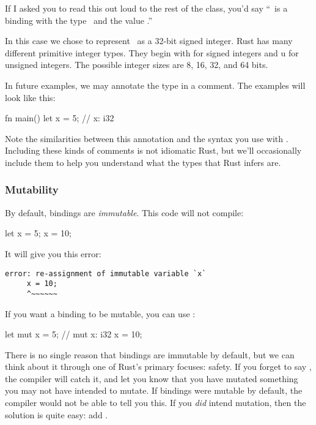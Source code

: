 If I asked you to read this out loud to the rest of the class, you'd say “\x\ is a binding with the type \itt\ and the
value .”

\blank

In this case we chose to represent \x\ as a 32-bit signed integer. Rust has many different primitive integer types. They 
begin with  for signed integers and u for unsigned integers. The possible integer sizes are 8, 16, 32, and 64 bits.

\blank

In future examples, we may annotate the type in a comment. The examples will look like this:

\begin{rustc}
fn main() {
    let x = 5; // x: i32
}
\end{rustc}

Note the similarities between this annotation and the syntax you use with \keylet. Including these kinds of comments is not
idiomatic Rust, but we'll occasionally include them to help you understand what the types that Rust infers are.

\subsubsection*{Mutability}

By default, bindings are \emph{immutable}. This code will not compile:

\begin{rustc}
let x = 5;
x = 10;
\end{rustc}

It will give you this error:

\begin{verbatim}
error: re-assignment of immutable variable `x`
     x = 10;
     ^~~~~~~
\end{verbatim}

If you want a binding to be mutable, you can use \mut:

\begin{rustc}
let mut x = 5; // mut x: i32
x = 10;
\end{rustc}

There is no single reason that bindings are immutable by default, but we can think about it through one of Rust's primary focuses:
safety. If you forget to say \mut, the compiler will catch it, and let you know that you have mutated something you may not
have intended to mutate. If bindings were mutable by default, the compiler would not be able to tell you this. If you \emph{did}
intend mutation, then the solution is quite easy: add \mut.

